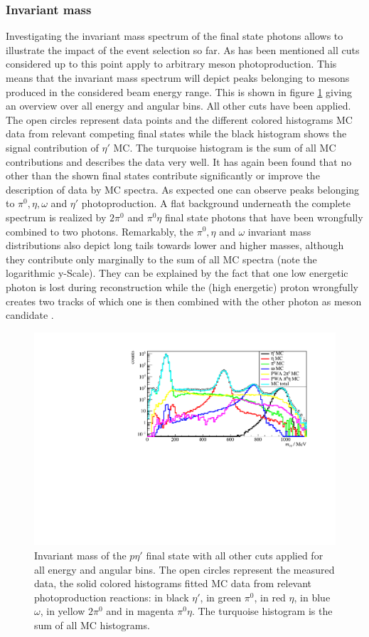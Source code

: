  \subsubsection{Invariant mass}
 Investigating the invariant mass spectrum of the final state photons allows to illustrate the impact of the event selection so far. As has been mentioned all cuts considered up to this point apply to arbitrary meson photoproduction. This means that the invariant mass spectrum will depict peaks belonging to mesons produced in the considered beam energy range. This is shown in figure \ref{fig:globalinv} giving an overview over all energy and angular bins. All other cuts have been applied. The open circles represent data points and the different colored histograms MC data from relevant competing final states while the black histogram shows the signal contribution of $\eta'$ MC. The turquoise histogram is the sum of all MC contributions and describes the data very well. It has again been found that no other than the shown final states contribute significantly or improve the description of data by MC spectra. As expected one can observe peaks belonging to $\pi^0,\eta, \omega$ and $\eta'$ photoproduction. A flat background underneath the complete spectrum is realized by $2\pi^0$ and $\pi^0\eta$ final state photons that have been wrongfully combined to two photons. Remarkably, the $\pi^0,\eta$ and $\omega$ invariant mass distributions also depict long tails towards lower and higher masses, although they contribute only marginally to the sum of all MC spectra (note the logarithmic y-Scale). They can be explained by the fact that one low energetic photon is lost during reconstruction while the (high energetic) proton wrongfully creates two tracks of which one is then combined with the other photon as meson candidate \cite{farahphd}.
 \begin{figure}[htbp]
	\centering
	\includegraphics[width=\linewidth]{../figs/hydrogen/invm_global.pdf}
	\caption{Invariant mass of the $p\eta'$ final state with all other cuts applied for all energy and angular bins. The open circles represent the measured data, the solid colored histograms fitted MC data from relevant photoproduction reactions: in black $\eta'$, in green $\pi^0$, in red $\eta$, in blue $\omega$, in yellow $2\pi^0$ and in magenta $\pi^0\eta$. The turquoise histogram is the sum of all MC histograms.}
	\label{fig:globalinv}
\end{figure} 

